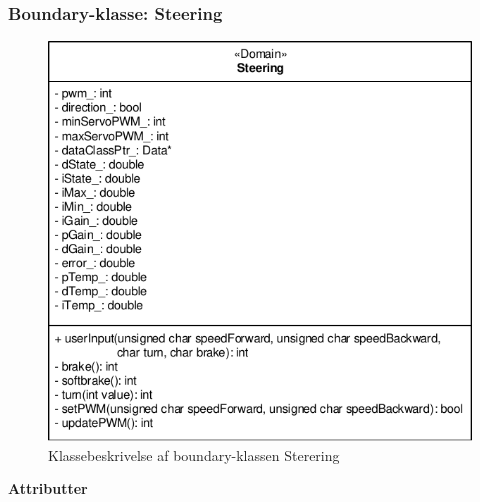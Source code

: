 
\subsubsection{Boundary-klasse: Steering}

\begin{figure}[h]
\centering
\includegraphics[]{../fig/diagrammer/bil/cd_steering.pdf}
\caption{Klassebeskrivelse af boundary-klassen Sterering}
\label{fig:cd_Sterering}
\end{figure}

\textbf{Attributter}

